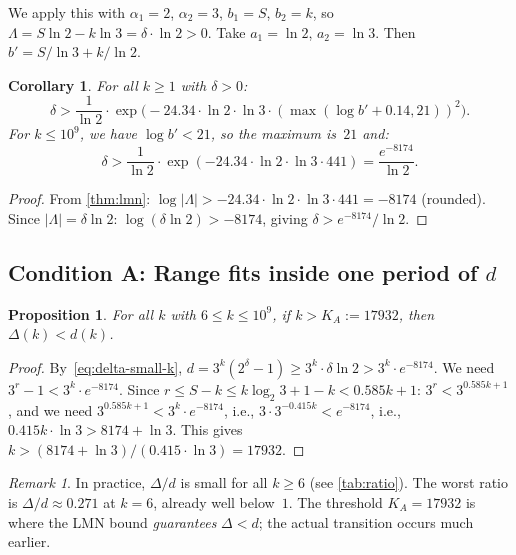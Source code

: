 \documentclass[11pt, a4paper]{amsart}
\theoremstyle{plain}
\newtheorem{proposition}[theorem]{Proposition}
\newtheorem{corollary}[theorem]{Corollary}
\theoremstyle{definition}
\theoremstyle{remark}
\newtheorem{remark}[theorem]{Remark}
\begin{document}
We apply this with $\alpha_1 = 2$, $\alpha_2 = 3$,
$b_1 = S$, $b_2 = k$, so
$\Lambda = S \ln 2 - k \ln 3 = \delta \cdot \ln 2 > 0$.
Take $a_1 = \ln 2$, $a_2 = \ln 3$.  Then
$b' = S/\ln 3 + k/\ln 2$.

\begin{corollary}\label{cor:delta-bound}
  For all $k \geq 1$ with $\delta > 0$:
  \begin{equation}\label{eq:delta-lower}
    \delta > \frac{1}{\ln 2} \cdot
    \exp\!\bigl(-24.34 \cdot \ln 2 \cdot \ln 3 \cdot
    (\max(\log b' + 0.14, 21))^2\bigr).
  \end{equation}
  For $k \leq 10^9$, we have $\log b' < 21$, so the
  maximum is~$21$ and:
  \begin{equation}\label{eq:delta-small-k}
    \delta > \frac{1}{\ln 2} \cdot
    \exp(-24.34 \cdot \ln 2 \cdot \ln 3 \cdot 441)
    = \frac{e^{-8174}}{\ln 2}.
  \end{equation}
\end{corollary}

\begin{proof}
  From \cref{thm:lmn}: $\log|\Lambda| > -24.34 \cdot \ln 2
  \cdot \ln 3 \cdot 441 = -8174$ (rounded).
  Since $|\Lambda| = \delta \ln 2$:
  $\log(\delta \ln 2) > -8174$, giving
  $\delta > e^{-8174} / \ln 2$.
\end{proof}

\subsection{Condition A: Range fits inside one period of $d$}
\label{ssec:condition-a}

\begin{proposition}\label{prop:cond-a}
  For all $k$ with $6 \leq k \leq 10^9$, if
  $k > K_A := 17932$, then $\Delta(k) < d(k)$.
\end{proposition}

\begin{proof}
  By~\eqref{eq:delta-small-k},
  $d = 3^k(2^\delta - 1) \geq 3^k \cdot \delta \ln 2
  > 3^k \cdot e^{-8174}$.
  We need $3^r - 1 < 3^k \cdot e^{-8174}$.
  Since $r \leq S - k \leq k \log_2 3 + 1 - k < 0.585k + 1$:
  $3^r < 3^{0.585k+1}$, and we need
  $3^{0.585k+1} < 3^k \cdot e^{-8174}$, i.e.,
  $3 \cdot 3^{-0.415k} < e^{-8174}$, i.e.,
  $0.415k \cdot \ln 3 > 8174 + \ln 3$.
  This gives $k > (8174 + \ln 3)/(0.415 \cdot \ln 3) = 17932$.
\end{proof}

\begin{remark}\label{rem:practical}
  In practice, $\Delta/d$ is small for all $k \geq 6$
  (see \cref{tab:ratio}).  The worst ratio is $\Delta/d
  \approx 0.271$ at $k = 6$, already well below~$1$.
  The threshold $K_A = 17932$ is where the LMN bound
  \emph{guarantees} $\Delta < d$; the actual transition
  occurs much earlier.
\end{remark}
\end{document}
